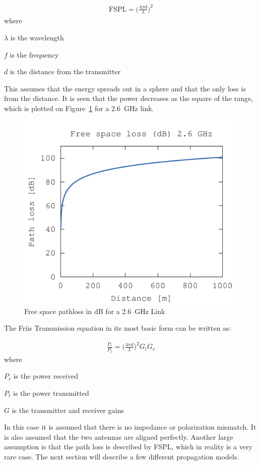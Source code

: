 \begin{align}
  \label{eq:fspl}
  \text{FSPL} = \big( \frac{4 \pi d}{\lambda} \big)^2 
\end{align}
where
\begin{where}
\item[$\lambda$] is the wavelength
\item[$f$] is the frequency
\item[$d$] is the distance from the transmitter 
\end{where}
This assumes that the energy spreads out in a sphere and that the only loss is from the distance. It is seen that the power decreases as the square of the range, which is plotted on Figure~\ref{fig:fspl-plot} for a \SI{2.6}{GHz} link.

\begin{figure}[htbp]
  \centering
  \includegraphics[scale=1]{img/analysis/distancePathloss}
  \caption{Free space pathloss in dB for a \SI{2.6}{GHz} Link}
  \label{fig:fspl-plot}
\end{figure}

The Friis Transmission equation in its most basic form can be written as: \cite{} 

\begin{align}
  \frac{P_r}{P_t} = \big( \frac{4 \pi d}{\lambda} \big)^2 G_{t} G_{r} 
\end{align}
where
\begin{where} 
\item[$P_r$] is the power received 
\item[$P_t$] is the power transmitted
\item[$G$] is the transmitter and receiver gains 
\end{where}
In this case it is assumed that there is no impedance or polarization mismatch. It is also assumed that the two antennas are aligned perfectly. Another large assumption is that the path loss is described by FSPL, which in reality is a very rare case. The next section will describe a few different propagation models. \cite{}



